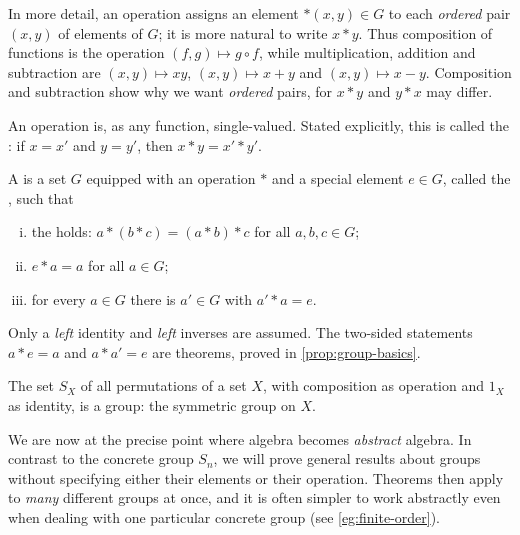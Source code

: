 In more detail, an operation assigns an element \(*(x,y) \in G\) to each \emph{ordered}
pair \((x,y)\) of elements of \(G\); it is more natural to write \(x * y\). Thus
composition of functions is the operation \((f,g) \mapsto g \circ f\), while
multiplication, addition and subtraction are \((x,y) \mapsto xy\),
\((x,y) \mapsto x+y\) and \((x,y) \mapsto x-y\). Composition and subtraction show why we
want \emph{ordered} pairs, for \(x * y\) and \(y * x\) may differ.

\begin{note}
	An operation is, as any function, single-valued. Stated explicitly, this is called the
	: if \(x = x'\) and \(y = y'\), then \(x*y = x'*y'\).
\end{note}

\begin{definition}[Group]\label{def:group}
	A  is a set \(G\) equipped with an operation \(*\) and a special element
	\(e \in G\), called the , such that
	\begin{enumerate}[(i)]
		\item the  holds: \(a*(b*c) = (a*b)*c\) for all
		      \(a,b,c \in G\);
		\item \(e * a = a\) for all \(a \in G\);
		\item for every \(a \in G\) there is \(a' \in G\) with \(a' * a = e\).
	\end{enumerate}
\end{definition}

\begin{remark}
	Only a \emph{left} identity and \emph{left} inverses are assumed. The two-sided
	statements \(a * e = a\) and \(a * a' = e\) are theorems, proved in
	\autoref{prop:group-basics}.
\end{remark}

The set \(S_X\) of all permutations of a set \(X\), with composition as operation and
\(1_X\) as identity, is a group: the symmetric group on \(X\).

\begin{intuition}
	We are now at the precise point where algebra becomes \emph{abstract} algebra. In
	contrast to the concrete group \(S_n\), we will prove general results about groups
	without specifying either their elements or their operation. Theorems then apply to
	\emph{many} different groups at once, and it is often simpler to work abstractly even
	when dealing with one particular concrete group (see \autoref{eg:finite-order}).
\end{intuition}


